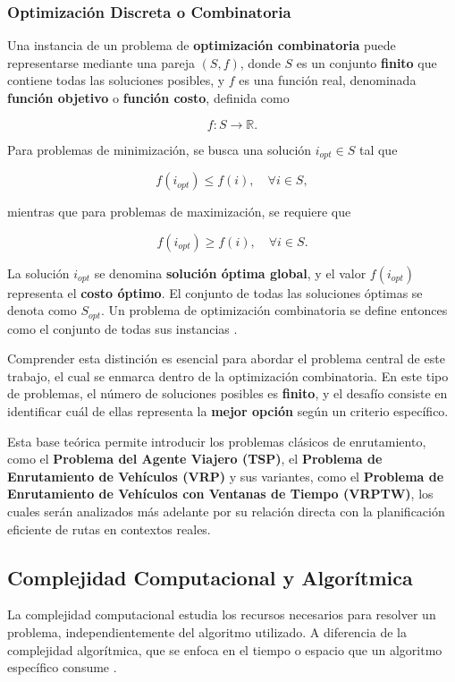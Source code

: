 \documentclass[12pt,titlepage,twoside,openright]{book}
\begin{document}
\subsubsection{Optimización Discreta o Combinatoria}
\label{subsec:opt_discreta}

Una instancia de un problema de \textbf{optimización combinatoria} puede representarse mediante una pareja \((S, f)\), donde \(S\) es un conjunto \textbf{finito} que contiene todas las soluciones posibles, y \(f\) es una función real, denominada \textbf{función objetivo} o \textbf{función costo}, definida como

\[
	f: S \to \mathbb{R}.
\]

Para problemas de minimización, se busca una solución \(i_{opt} \in S\) tal que

\[
	f(i_{opt}) \leq f(i), \quad \forall i \in S,
\]

mientras que para problemas de maximización, se requiere que

\[
	f(i_{opt}) \geq f(i), \quad \forall i \in S.
\]

La solución \(i_{opt}\) se denomina \textbf{solución óptima global}, y el valor \(f(i_{opt})\) representa el \textbf{costo óptimo}. El conjunto de todas las soluciones óptimas se denota como \(S_{opt}\). Un problema de optimización combinatoria se define entonces como el conjunto de todas sus instancias \citep{cobos2010}.

Comprender esta distinción es esencial para abordar el problema central de este trabajo, el cual se enmarca dentro de la optimización combinatoria. En este tipo de problemas, el número de soluciones posibles es \textbf{finito}, y el desafío consiste en identificar cuál de ellas representa la \textbf{mejor opción} según un criterio específico. 

Esta base teórica permite introducir los problemas clásicos de enrutamiento, como el \textbf{Problema del Agente Viajero (TSP)}, el \textbf{Problema de Enrutamiento de Vehículos (VRP)} y sus variantes, como el \textbf{Problema de Enrutamiento de Vehículos con Ventanas de Tiempo (VRPTW)}, los cuales serán analizados más adelante por su relación directa con la planificación eficiente de rutas en contextos reales.

\subsection{Complejidad Computacional y Algorítmica}

La complejidad computacional estudia los recursos necesarios para resolver un problema, independientemente del algoritmo utilizado. A diferencia de la complejidad algorítmica, que se enfoca en el tiempo o espacio que un algoritmo específico consume \citep{maldonado2013problema}.
\end{document}
